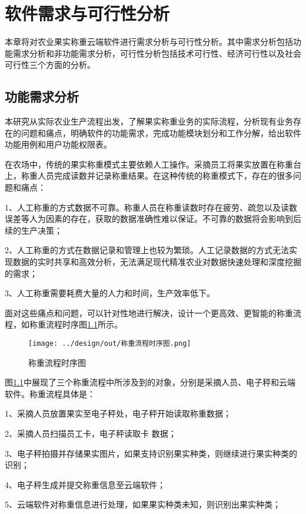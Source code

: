 \chapter{软件需求与可行性分析}

本章将对农业果实称重云端软件进行需求分析与可行性分析。其中需求分析包括功能需求分析和非功能需求分析，可行性分析包括技术可行性、经济可行性以及社会可行性三个方面的分析。

\section{功能需求分析}\label{sec:req1}

本研究从实际农业生产流程出发，了解果实称重业务的实际流程，分析现有业务存在的问题和痛点，明确软件的功能需求，完成功能模块划分和工作分解，给出软件功能用例和用户功能权限表。

在农场中，传统的果实称重模式主要依赖人工操作。采摘员工将果实放置在称重台上，称重人员完成读数并记录称重结果。在这种传统的称重模式下，存在的很多问题和痛点：

1、人工称重的方式数据不可靠。称重人员在称重读数时存在疲劳、疏忽以及读数误差等人为因素的存在，获取的数据准确性难以保证。不可靠的数据将会影响到后续的生产决策；

2、人工称重的方式在数据记录和管理上也较为繁琐。人工记录数据的方式无法实现数据的实时共享和高效分析，无法满足现代精准农业对数据快速处理和深度挖掘的需求；

3、人工称重需要耗费大量的人力和时间，生产效率低下。

面对这些痛点和问题，可以针对性地进行解决，设计一个更高效、更智能的称重流程，如称重流程时序图\ref{fig:称重流程时序图}所示。

\begin{figure}[H]
    \centering
    \texttt{[image: ../design/out/称重流程时序图.png]}
    \caption{称重流程时序图}
    \label{fig:称重流程时序图}
\end{figure}

图\ref{fig:称重流程时序图}中展现了三个称重流程中所涉及到的对象，分别是采摘人员、电子秤和云端软件。称重流程具体是：

1、采摘人员放置果实至电子秤处，电子秤开始读取称重数据；

2、采摘人员扫描员工卡，电子秤读取卡
数据；

3、电子秤拍摄并存储果实图片，如果支持识别果实种类，则继续进行果实种类的识别；

4、电子秤生成并提交称重信息至云端软件；

5、云端软件对称重信息进行处理，如果果实种类未知，则识别出果实种类；

